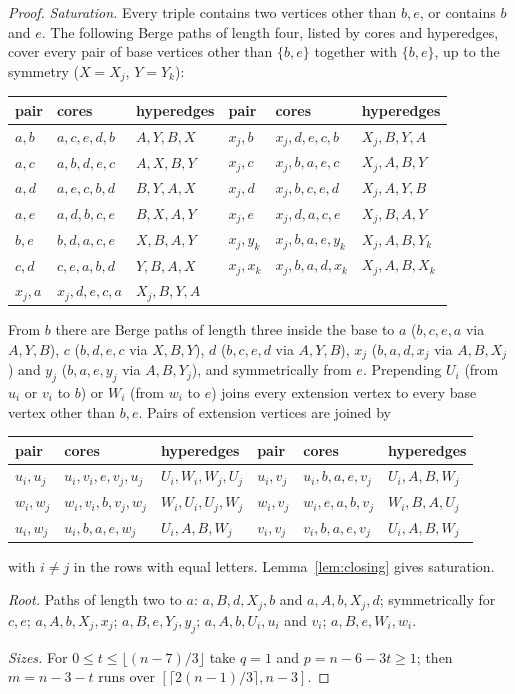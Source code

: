 \documentclass[11pt]{article}
\theoremstyle{remark}
\begin{document}
\begin{proof}
\emph{Saturation.} Every triple contains two vertices other than $b,e$, or
contains $b$ and $e$. The following Berge paths of length four, listed by
cores and hyperedges, cover every pair of base vertices other than
$\{b,e\}$ together with $\{b,e\}$, up to the symmetry ($X=X_j$, $Y=Y_k$):
\begin{center}\small
\begin{tabular}{lll@{\qquad}lll}
\toprule
pair & cores & hyperedges & pair & cores & hyperedges\\
\midrule
$a,b$ & $a,c,e,d,b$ & $A,Y,B,X$ & $x_j,b$ & $x_j,d,e,c,b$ & $X_j,B,Y,A$\\
$a,c$ & $a,b,d,e,c$ & $A,X,B,Y$ & $x_j,c$ & $x_j,b,a,e,c$ & $X_j,A,B,Y$\\
$a,d$ & $a,e,c,b,d$ & $B,Y,A,X$ & $x_j,d$ & $x_j,b,c,e,d$ & $X_j,A,Y,B$\\
$a,e$ & $a,d,b,c,e$ & $B,X,A,Y$ & $x_j,e$ & $x_j,d,a,c,e$ & $X_j,B,A,Y$\\
$b,e$ & $b,d,a,c,e$ & $X,B,A,Y$ & $x_j,y_k$ & $x_j,b,a,e,y_k$ & $X_j,A,B,Y_k$\\
$c,d$ & $c,e,a,b,d$ & $Y,B,A,X$ & $x_j,x_k$ & $x_j,b,a,d,x_k$ & $X_j,A,B,X_k$\\
$x_j,a$ & $x_j,d,e,c,a$ & $X_j,B,Y,A$ & & & \\
\bottomrule
\end{tabular}
\end{center}
From $b$ there are Berge paths of length three inside the base to $a$
($b,c,e,a$ via $A,Y,B$), $c$ ($b,d,e,c$ via $X,B,Y$), $d$ ($b,c,e,d$ via
$A,Y,B$), $x_j$ ($b,a,d,x_j$ via $A,B,X_j$) and $y_j$ ($b,a,e,y_j$ via
$A,B,Y_j$), and symmetrically from $e$. Prepending $U_i$ (from $u_i$ or
$v_i$ to $b$) or $W_i$ (from $w_i$ to $e$) joins every extension vertex to
every base vertex other than $b,e$. Pairs of extension vertices are joined
by
\begin{center}\small
\begin{tabular}{lll@{\qquad}lll}
\toprule
pair & cores & hyperedges & pair & cores & hyperedges\\
\midrule
$u_i,u_j$ & $u_i,v_i,e,v_j,u_j$ & $U_i,W_i,W_j,U_j$ & $u_i,v_j$ & $u_i,b,a,e,v_j$ & $U_i,A,B,W_j$\\
$w_i,w_j$ & $w_i,v_i,b,v_j,w_j$ & $W_i,U_i,U_j,W_j$ & $w_i,v_j$ & $w_i,e,a,b,v_j$ & $W_i,B,A,U_j$\\
$u_i,w_j$ & $u_i,b,a,e,w_j$ & $U_i,A,B,W_j$ & $v_i,v_j$ & $v_i,b,a,e,v_j$ & $U_i,A,B,W_j$\\
\bottomrule
\end{tabular}
\end{center}
with $i\ne j$ in the rows with equal letters. Lemma~\ref{lem:closing}
gives saturation.

\emph{Root.} Paths of length two to $a$: $a,B,d,X_j,b$ and $a,A,b,X_j,d$;
symmetrically for $c,e$; $a,A,b,X_j,x_j$; $a,B,e,Y_j,y_j$;
$a,A,b,U_i,u_i$ and $v_i$; $a,B,e,W_i,w_i$.

\emph{Sizes.} For $0\le t\le\lfloor(n-7)/3\rfloor$ take $q=1$ and
$p=n-6-3t\ge1$; then $m=n-3-t$ runs over $[\lceil2(n-1)/3\rceil,n-3]$.
\end{proof}
\end{document}
